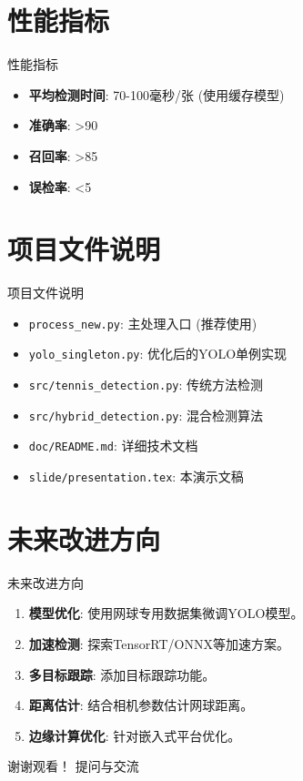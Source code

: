 \documentclass{beamer}
\begin{document}
\section{性能指标}
\begin{frame}{性能指标}
  \begin{itemize}
    \item \textbf{平均检测时间}: 70-100毫秒/张 (使用缓存模型)
    \item \textbf{准确率}: >90%
    \item \textbf{召回率}: >85%
    \item \textbf{误检率}: <5%
  \end{itemize}
\end{frame}

\section{项目文件说明}
\begin{frame}{项目文件说明}
  \begin{itemize}
    \item \texttt{process\_new.py}: 主处理入口 (推荐使用)
    \item \texttt{yolo\_singleton.py}: 优化后的YOLO单例实现
    \item \texttt{src/tennis\_detection.py}: 传统方法检测
    \item \texttt{src/hybrid\_detection.py}: 混合检测算法
    \item \texttt{doc/README.md}: 详细技术文档
    \item \texttt{slide/presentation.tex}: 本演示文稿
  \end{itemize}
\end{frame}


\section{未来改进方向}
\begin{frame}{未来改进方向}
  \begin{enumerate}
    \item \textbf{模型优化}: 使用网球专用数据集微调YOLO模型。
    \item \textbf{加速检测}: 探索TensorRT/ONNX等加速方案。
    \item \textbf{多目标跟踪}: 添加目标跟踪功能。
    \item \textbf{距离估计}: 结合相机参数估计网球距离。
    \item \textbf{边缘计算优化}: 针对嵌入式平台优化。
  \end{enumerate}
\end{frame}

\begin{frame}
  \centering
  {\Huge 谢谢观看！}
  \vfill
  提问与交流
\end{frame}
\end{document}
